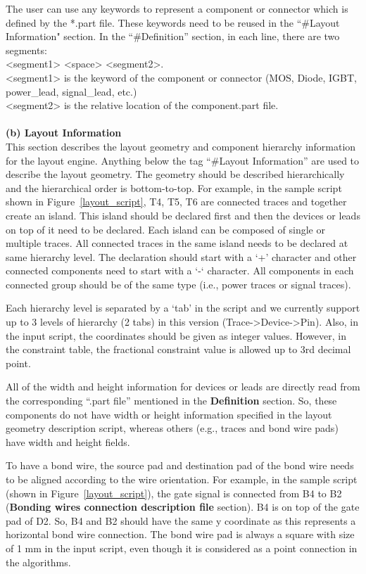 \documentclass[11pt]{article}
\begin{document}
\begin{enumerate}
    The user can use any keywords to represent a component or connector which is defined by the *.part file. These keywords need to be reused in the “\#Layout Information" section. In the “\#Definition” section, in each line, there are two segments:\\ <segment1> <space> <segment2>.\\
    <segment1> is the keyword of the component or connector (MOS, Diode, IGBT, power\_lead, signal\_lead, etc.)\\
    <segment2> is the relative location of the component.part file.\\\\
    
	\textbf{(b) Layout Information}\\
	This section describes the layout geometry and component hierarchy information for the layout engine. Anything below the tag “\#Layout Information” are used to describe the layout geometry. The geometry should be described hierarchically and the hierarchical order is bottom-to-top. For example, in the sample script shown in Figure~\ref{layout_script}, T4, T5, T6 are connected traces and together create an island. This island should be declared first and then the devices or leads on top of it need to be declared. Each island can be composed of single or multiple traces. All connected traces in the same island needs to be declared at same hierarchy level. The declaration should start with a ‘+’ character and other connected components need to start with a ‘-‘ character. All components in each connected group should be of the same type (i.e., power traces or signal traces).

    Each hierarchy level is separated by a ‘tab’ in the script and we currently support up to 3 levels of hierarchy (2 tabs) in this version (Trace->Device->Pin). Also, in the input script, the coordinates should be given as integer values. However, in the constraint table, the fractional constraint value is allowed up to 3rd decimal point.

    All of the width and height information for devices or leads are directly read from the corresponding “.part file” mentioned in the \textbf{Definition} section. So, these components do not have width or height information specified in the layout geometry description script, whereas others (e.g., traces and bond wire pads) have width and height fields.

    To have a bond wire, the source pad and destination pad of the bond wire needs to be aligned according to the wire orientation. For example, in the sample script (shown in Figure~\ref{layout_script}), the gate signal is connected from B4 to B2 (\textbf{Bonding wires connection description file} section). B4 is on top of the gate pad of D2. So, B4 and B2 should have the same y coordinate as this represents a horizontal bond wire connection.
    The bond wire pad is always a square with size of 1 mm in the input script, even though it is considered as a point connection in the algorithms.
    

\end{enumerate}
\end{document}
